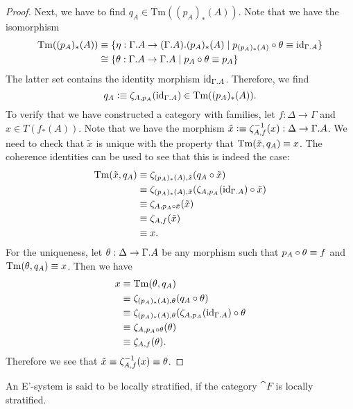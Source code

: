\begin{proof}
Next, we have to find $q_A\in\mathrm{Tm}((p_A)_\ast(A))$. Note that we have the
isomorphism
\begin{align*}
\mathrm{Tm}((p_A)_\ast(A))
& \jdeq \{\eta :\ctxext{\Gamma}{A}\to\ctxext{{\Gamma}{A}}{(p_A)_\ast(A)}\mid p_{(p_A)_\ast(A)}\circ\theta\jdeq\catid{\ctxext{\Gamma}{A}}\} \\
& \cong \{\theta : \ctxext{\Gamma}{A}\to\ctxext{\Gamma}{A} \mid p_A\circ \theta\jdeq p_A\}
\end{align*}
The latter set contains the identity morphism $\catid{\ctxext{\Gamma}{A}}$. Therefore,
we find
\begin{equation*}
q_A \defeq \zeta_{A,p_A}(\catid{\ctxext{\Gamma}{A}})\in\mathrm{Tm}((p_A)_\ast(A)).
\end{equation*}
To verify that we have constructed a category with families, let $f:\Delta\to\Gamma$
and $x\in T(f_\ast(A))$. Note that we have the morphism 
$\tilde{x}\defeq \zeta_{A,f}^{-1}(x):\Delta\to\ctxext{\Gamma}{A}$. 
We need to check that $\tilde{x}$ is unique with the property that 
$\mathrm{Tm}(\tilde{x},q_A)\equiv x$. The coherence identities can be used to see
that this is indeed the case:
\begin{align*}
\mathrm{Tm}(\tilde{x},q_A)
& \jdeq \zeta_{(p_A)_\ast(A),\tilde{x}}(q_A\circ\tilde{x}) \\
& \jdeq \zeta_{(p_A)_\ast(A),\tilde{x}}(\zeta_{A,p_A}(\catid{\ctxext{\Gamma}{A}})\circ\tilde{x}) \\
& \jdeq \zeta_{A,p_A\circ\tilde{x}}(\tilde{x}) \\
& \jdeq \zeta_{A,f}(\tilde{x}) \\
& \jdeq x.
\end{align*}
For the uniqueness, let $\theta:\Delta\to\ctxext{\Gamma}{A}$ be any morphism such that
$p_A\circ\theta\equiv f$ and $\mathrm{Tm}(\theta,q_A)\equiv x$. Then we have
\begin{align*}
x & \jdeq \mathrm{Tm}(\theta,q_A) \\
& \jdeq \zeta_{(p_A)_\ast(A),\theta}(q_A\circ\theta) \\
& \jdeq \zeta_{(p_A)_\ast(A),\theta}(\zeta_{A,p_A}(\catid{\ctxext{\Gamma}{A}})\circ\theta \\
& \jdeq \zeta_{A,p_A\circ\theta}(\theta) \\
& \jdeq \zeta_{A,f}(\theta).
\end{align*}
Therefore we see that $\tilde{x}\equiv\zeta_{A,f}^{-1}(x)\equiv\theta$.
\end{proof}

\begin{defn}
An E'-system is said to be locally stratified, if the category $\cat{F}$ is
locally stratified.
\end{defn}


